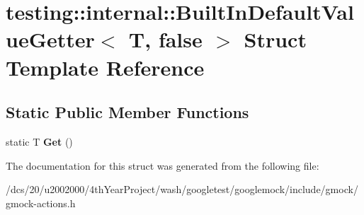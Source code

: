\hypertarget{structtesting_1_1internal_1_1BuiltInDefaultValueGetter_3_01T_00_01false_01_4}{}\section{testing\+:\+:internal\+:\+:Built\+In\+Default\+Value\+Getter$<$ T, false $>$ Struct Template Reference}
\label{structtesting_1_1internal_1_1BuiltInDefaultValueGetter_3_01T_00_01false_01_4}
\subsection*{Static Public Member Functions}
\begin{DoxyCompactItemize}
\item 
\mbox{\label{structtesting_1_1internal_1_1BuiltInDefaultValueGetter_3_01T_00_01false_01_4_a8c8e929666f61272961eea21a60de4ad}} 
static T {\bfseries Get} ()
\end{DoxyCompactItemize}


The documentation for this struct was generated from the following file\+:\begin{DoxyCompactItemize}
\item 
/dcs/20/u2002000/4th\+Year\+Project/wash/googletest/googlemock/include/gmock/gmock-\/actions.\+h\end{DoxyCompactItemize}
